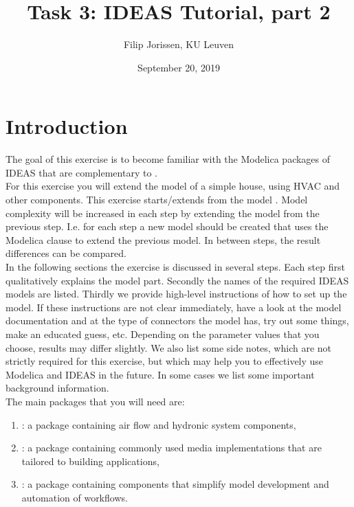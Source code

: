 \documentclass[10pt,a4paper]{article}
\begin{document}
\title{Task 3: IDEAS Tutorial, part 2}
\author{Filip Jorissen, KU Leuven}
\date{September 20, 2019}
\maketitle

\section*{Introduction}
The goal of this exercise is to become familiar with the 
Modelica packages of IDEAS that are
complementary to . \\

For this exercise you will extend the model of a simple house,
using HVAC and other components.
This exercise starts/extends from the model . 
Model complexity will be increased in each step by 
extending the model from the previous step. 
I.e. for each step a new model should be created that uses
the Modelica  clause to extend the previous model.
In between steps, the result differences can be compared.\\


In the following sections the exercise is discussed 
in several steps. 
Each step first qualitatively explains the model part.
Secondly the names of the required IDEAS models 
are listed.
Thirdly we provide high-level instructions of how to
set up the model.
If these instructions are not clear immediately, 
have a look at the model documentation and at the type of
connectors the model has, 
try out some things, 
make an educated guess, etc.
Depending on the parameter values that you choose, results
may differ slightly.
We also list some side notes, which are not strictly required for this
exercise, but which may help you to effectively use Modelica
and IDEAS in the future.
In some cases we list some important background information.\\

The main packages that you will need are:
\begin{enumerate}
\item {}: a package containing air flow and hydronic system components,
\item {}: a package containing commonly used media implementations that are tailored to building applications,
\item {}: a package containing components that simplify model development and automation of workflows.
\end{enumerate}
\end{document}
